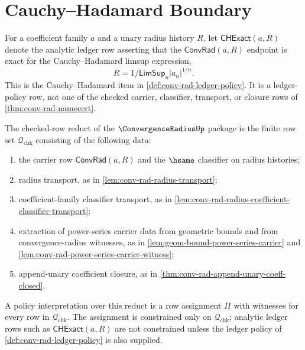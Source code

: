\section{Cauchy--Hadamard Boundary}
\label{sec:convrad-cauchy-hadamard-boundary}

\begin{definition}
\label{def:convrad-cauchy-hadamard-exactness-row}
For a coefficient family $a$ and a unary radius history $R$, let
$\mathsf{CHExact}(a,R)$ denote the analytic ledger row asserting that the
$\mathsf{ConvRad}(a,R)$ endpoint is exact for the Cauchy--Hadamard limsup
expression,
$$
R = 1/\mathsf{LimSup}_n |a_n|^{1/n}.
$$
This is the Cauchy--Hadamard item in \autoref{def:conv-rad-ledger-policy}. It
is a ledger-policy row, not one of the checked carrier, classifier, transport,
or closure rows of \autoref{thm:conv-rad-namecert}.
\end{definition}

\begin{definition}
\label{def:convrad-checked-row-reduct}
The checked-row reduct of the $\ConvergenceRadiusUp$ package is the finite row
set $\mathcal Q_{\mathrm{chk}}$ consisting of the following data:
\begin{enumerate}
  \item the carrier row $\mathsf{ConvRad}(a,R)$ and the $\hsame$ classifier on
  radius histories;
  \item radius transport, as in \autoref{lem:conv-rad-radius-transport};
  \item coefficient-family classifier transport, as in
  \autoref{lem:conv-rad-radius-coefficient-classifier-transport};
  \item extraction of power-series carrier data from geometric bounds and from
  convergence-radius witnesses, as in
  \autoref{lem:geom-bound-power-series-carrier} and
  \autoref{lem:conv-rad-power-series-carrier-witness};
  \item append-unary coefficient closure, as in
  \autoref{thm:conv-rad-append-unary-coeff-closed}.
\end{enumerate}
A policy interpretation over this reduct is a row assignment $\Pi$ with
witnesses for every row in $\mathcal Q_{\mathrm{chk}}$. The assignment is
constrained only on $\mathcal Q_{\mathrm{chk}}$; analytic ledger rows such as
$\mathsf{CHExact}(a,R)$ are not constrained unless the ledger policy of
\autoref{def:conv-rad-ledger-policy} is also supplied.
\end{definition}


